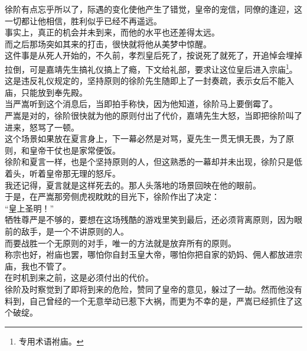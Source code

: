 \begin{multicols}{\theparacolNo}
徐阶有点忘乎所以了，际遇的变化使他产生了错觉，皇帝的宠信，同僚的逢迎，这一切都让他相信，胜利似乎已经不再遥远。\\

事实上，真正的机会并未到来，而他的水平也还差得太远。\\

而之后那场突如其来的打击，很快就将他从美梦中惊醒。\\

这件事是从死人开始的，不久前，孝烈皇后死了，按说死了就死了，开追悼会埋掉拉倒，可是嘉靖先生搞礼仪搞上了瘾，下文给礼部，要求让这位皇后进入宗庙\footnote{专用术语袝庙。}。\\

这是违反礼仪规定的，坚持原则的徐阶先生随即上了一封奏疏，表示女后不能入庙，只能放到奉先殿。\\

当严嵩听到这个消息后，当即拍手称快，因为他知道，徐阶马上要倒霉了。\\

严嵩是对的，徐阶很快就为他的原则付出了代价，嘉靖先生大怒，当即把徐阶叫了进来，怒骂了一顿。\\

这个场景如果放在夏言身上，下一幕必然是对骂，夏先生一贯无惧无畏，为了原则，和皇帝干仗也是家常便饭。\\

徐阶和夏言一样，也是个坚持原则的人，但这熟悉的一幕却并未出现，徐阶只是低着头，听着皇帝那无理的怒斥。\\

我还记得，夏言就是这样死去的。那人头落地的场景回映在他的眼前。\\

于是，在严嵩那旁侧虎视眈眈的目光下，徐阶作出了决定：\\

“皇上圣明！”\\

牺牲尊严是不够的，要想在这场残酷的游戏里笑到最后，还必须背离原则，因为眼前的敌手，是一个不讲原则的人。\\

而要战胜一个无原则的对手，唯一的方法就是放弃所有的原则。\\

称宗也好，袝庙也罢，哪怕你自封玉皇大帝，哪怕你把自家的奶妈、佣人都放进宗庙，我也不管了。\\

在时机到来之前，这是必须付出的代价。\\

徐阶及时察觉到了即将到来的危险，赞同了皇帝的意见，躲过了一劫。然而他没有料到，自己曾经的一个无意举动已惹下大祸，而更为不幸的是，严嵩已经抓住了这个破绽。\\


\end{multicols}
